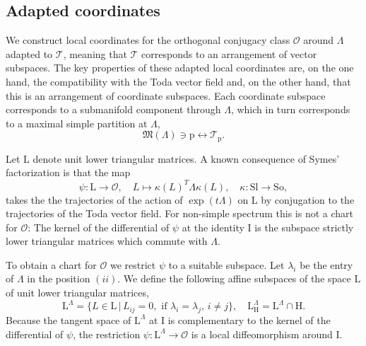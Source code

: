 \documentclass[reqno]{amsart}
\newcommand{\p}{\mathrm{p}}
\newcommand{\cO}{\mathcal{O}}
\newcommand{\cT}{\mathcal{T}}
\newcommand{\Sl}{\mathrm{Sl}}
\newcommand{\So}{\mathrm{So}}
\renewcommand{\L}{\mathrm{L}}
\renewcommand{\H}{\mathrm{H}}
\begin{document}
\subsection{Adapted coordinates}\label{ssec:adapted-coordinates}
We construct local coordinates for the orthogonal conjugacy class $\cO$ around $\Lambda$ adapted to $\cT$,  meaning that $\cT$ corresponds to an arrangement of vector subspaces. The key properties of these adapted local coordinates are, on the one hand, the compatibility with the Toda vector field and, on the other hand, that this is an arrangement  of coordinate subspaces. Each coordinate subspace  corresponds to a submanifold component through $\Lambda$, which in turn corresponds to a maximal simple partition at $\Lambda$,
\[\mathfrak{M}(\Lambda)\ni \p\longleftrightarrow \cT_\p.\]



Let $\L$ denote unit lower triangular matrices.
A known consequence of Symes' factorization is
that  the map
\[\psi: \L\to  \cO,\quad L\mapsto \kappa(L)^T\Lambda \kappa(L),\quad \kappa:\Sl\to \So,\]
 takes the the trajectories of the action of $\exp(t\Lambda)$ on $\L$ by conjugation to the trajectories of the Toda vector field. For non-simple spectrum this is not a chart for $\cO$:
The kernel of the differential of $\psi$ at the identity $\mathrm{I}$ is the subspace  strictly lower triangular matrices which commute with $\Lambda$.

To obtain a chart for $\cO$ we restrict $\psi$ to a suitable subspace. Let  $\lambda_i$ be the entry of $\Lambda$ in the position $(ii)$. We define the following affine subspaces of the space $\L$ of unit lower triangular matrices,
\begin{equation}\label{eq:chart-domain}
 \L^\Lambda=\{L\in \L\,|\, L_{ij}=0,\,\,\mathrm{if}\,\,\lambda_i=\lambda_j,\,i\neq j\},\quad \L^\Lambda_\H=\L^\Lambda\cap \H.
\end{equation}
Because the tangent space of $\L^\Lambda$ at $\mathrm{I}$ is complementary to the kernel of the differential of $\psi$, the restriction $\psi: \L^\Lambda\to  \cO$ is a local diffeomorphism around $\mathrm{I}$.
\end{document}
